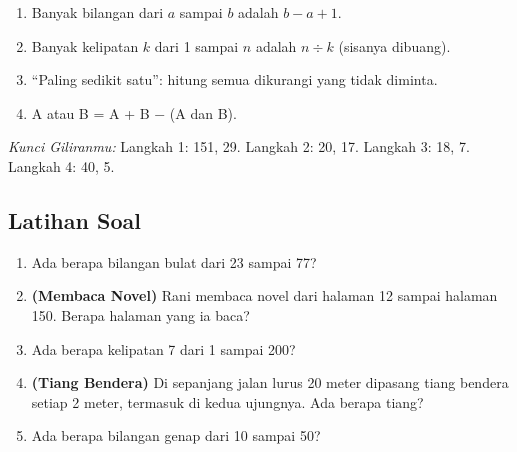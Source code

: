 \documentclass[11pt,a4paper]{article}
\begin{document}
\begin{rangkuman}
\begin{enumerate}
    \item Banyak bilangan dari $a$ sampai $b$ adalah $b - a + 1$.
    \item Banyak kelipatan $k$ dari 1 sampai $n$ adalah $n \div k$ (sisanya dibuang).
    \item ``Paling sedikit satu'': hitung semua dikurangi yang tidak diminta.
    \item A atau B = A + B $-$ (A dan B).
\end{enumerate}
\end{rangkuman}

\textit{Kunci Giliranmu:} Langkah 1: 151, 29. \quad Langkah 2: 20, 17. \quad Langkah 3: 18, 7.
\quad Langkah 4: 40, 5.

\newpage
\subsection*{Latihan Soal}

\begin{enumerate}
  \item Ada berapa bilangan bulat dari 23 sampai 77?
  \item \textbf{(Membaca Novel)} Rani membaca novel dari halaman 12 sampai halaman 150.
        Berapa halaman yang ia baca?
  \item Ada berapa kelipatan 7 dari 1 sampai 200?
  \item \textbf{(Tiang Bendera)} Di sepanjang jalan lurus 20 meter dipasang tiang bendera setiap
        2 meter, termasuk di kedua ujungnya. Ada berapa tiang?
  \item Ada berapa bilangan genap dari 10 sampai 50?
\end{enumerate}
\end{document}
